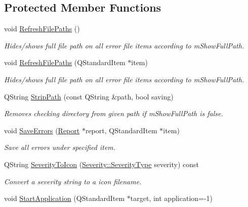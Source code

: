\subsection*{Protected Member Functions}
\begin{DoxyCompactItemize}
\item 
void \hyperlink{class_results_tree_a3d9043f2c4d28cf26954988e5c27d9e3}{Refresh\-File\-Paths} ()
\begin{DoxyCompactList}\small\item\em Hides/shows full file path on all error file items according to m\-Show\-Full\-Path. \end{DoxyCompactList}\item 
void \hyperlink{class_results_tree_ad326e81f640835a5ffbcac68a7fe363c}{Refresh\-File\-Paths} (Q\-Standard\-Item $\ast$item)
\begin{DoxyCompactList}\small\item\em Hides/shows full file path on all error file items according to m\-Show\-Full\-Path. \end{DoxyCompactList}\item 
Q\-String \hyperlink{class_results_tree_ac81d51e8c334869b125a83b8907bd393}{Strip\-Path} (const Q\-String \&path, bool saving)
\begin{DoxyCompactList}\small\item\em Removes checking directory from given path if m\-Show\-Full\-Path is false. \end{DoxyCompactList}\item 
void \hyperlink{class_results_tree_a00a570f21de0f2f2d759f5de0668d359}{Save\-Errors} (\hyperlink{class_report}{Report} $\ast$report, Q\-Standard\-Item $\ast$item)
\begin{DoxyCompactList}\small\item\em Save all errors under specified item. \end{DoxyCompactList}\item 
Q\-String \hyperlink{class_results_tree_aa75467b65715c99c2ab3d7b0f575fb34}{Severity\-To\-Icon} (\hyperlink{class_severity_ac185938ae084355bbf1790cf1a70caa6}{Severity\-::\-Severity\-Type} severity) const 
\begin{DoxyCompactList}\small\item\em Convert a severity string to a icon filename. \end{DoxyCompactList}\item 
void \hyperlink{class_results_tree_ab99d7ca6fd7120fb10166b6e92b16809}{Start\-Application} (Q\-Standard\-Item $\ast$target, int application=-\/1)

\end{DoxyCompactItemize}
